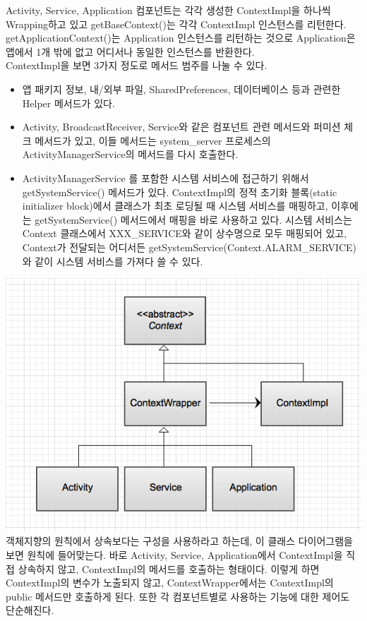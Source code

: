 Activity, Service, Application 컴포넌트는 각각 생성한 ContextImpl을 하나씩 Wrapping하고 있고 getBaseContext()는 각각 ContextImpl 인스턴스를 리턴한다. getApplicationContext()는 Application 인스턴스를 리턴하는 것으로 Application은 앱에서 1개 밖에 없고 어디서나 동일한 인스턴스를 반환한다.\\

ContextImpl을 보면 3가지 정도로 메서드 범주를 나눌 수 있다.
\begin{itemize}
\item 앱 패키지 정보, 내/외부 파일, SharedPreferences, 데이터베이스 등과 관련한 Helper 메서드가 있다. 

\item Activity, BroadcastReceiver, Service와 같은 컴포넌트 관련 메서드와 퍼미션 체크 메서드가 있고, 이들 메서드는 system\_server 프로세스의 ActivityManagerService의 메서드를 다시 호출한다. 

\item ActivityManagerService 를 포함한 시스템 서비스에 접근하기 위해서 getSystemService() 메서드가 있다. 
ContextImpl의 정적 초기화 블록(static initializer block)에서 클래스가 최초 로딩될 때 시스템 서비스를 매핑하고, 이후에는 getSystemService() 메서드에서 매핑을 바로 사용하고 있다.
시스템 서비스는 Context 클래스에서 XXX\_SERVICE와 같이 상수명으로 모두 매핑되어 있고, Context가 전달되는 어디서든 getSystemService(Context.ALARM\_SERVICE)와 같이 시스템 서비스를 가져다 쓸 수 있다.
\end{itemize}

\includegraphics[scale=0.5]{context}\\
객체지향의 원칙에서 상속보다는 구성을 사용하라고 하는데, 이 클래스 다이어그램을 보면 원칙에 들어맞는다.
바로 Activity, Service, Application에서 ContextImpl을 직접 상속하지 않고, ContextImpl의 메서드를 호출하는 형태이다. 이렇게 하면 ContextImpl의 변수가 노출되지 않고, ContextWrapper에서는 ContextImpl의 public 메서드만 호출하게 된다. 또한 각 컴포넌트별로 사용하는 기능에 대한 제어도 단순해진다.\\


